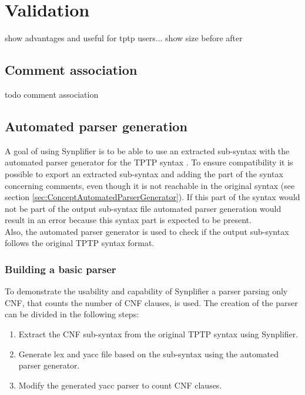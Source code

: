 \chapter{Validation}\label{sec:Validation}

show advantages and useful for tptp users...
show size before after 

\section{Comment association}\label{sec:ValidationCommentAssociation}

todo comment association

\section{Automated parser generation}\label{sec:ValidationAutomatedParserGeneration}

A goal of using \ac{Synplifier} is to be able to use an extracted sub-syntax with the automated parser generator for the \ac{TPTP} syntax \cite{VS06}.
To ensure compatibility it is possible to export an extracted sub-syntax and adding the part of the syntax concerning comments, even though it is not reachable in the original syntax (see section \ref{sec:ConceptAutomatedParserGenerator}). If this part of the syntax would not be part of the output sub-syntax file automated parser generation would result in an error because this syntax part is expected to be present.\\
Also, the automated parser generator is used to check if the output sub-syntax follows the original \ac{TPTP} syntax format.

\subsection{Building a basic parser}\label{sec:ValidationAutomatedParserGenerationBuildingBasicParser}

To demonstrate the usability and capability of \ac{Synplifier} a parser parsing only \ac{CNF}, that counts the number of \ac{CNF} clauses, is used.
The creation of the parser can be divided in the following steps:
\begin{enumerate}%
	\item Extract the \ac{CNF} sub-syntax from the original \ac{TPTP} syntax using \ac{Synplifier}.
	\item Generate lex and yacc file based on the sub-syntax using the automated parser generator.
	\item Modify the generated yacc parser to count \ac{CNF} clauses.
\end{enumerate}

